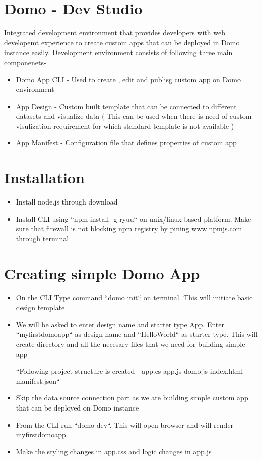 \section{Domo - Dev Studio}

Integrated development environment that provides developers 
with web developemt experience to create custom apps that 
can be deployed in Domo instance easily. Development environment 
consists of following three main componenets-
\begin{itemize}
\item Domo App CLI - Used to create , edit and publisg custom app 
on Domo environment
\item App Design - Custom built template that can be connected to 
different datasets and visualize data ( This can be used when 
there is need of custom visulization requirement for which 
standard template is not available )
\item App Manifest - Configuration file that defines properties 
of custom app
\end{itemize}

\section{Installation}
\begin{itemize}
\item Install node.js through download
\item Install CLI using ``npm install -g ryuu`` on unix/linux based platform. 
   Make sure that firewall is not blocking npm registry by pining
   www.npmjs.com through terminal
\end{itemize}


\section{Creating simple Domo App}
\begin{itemize}
\item On the CLI Type command  ``domo init`` on terminal.
   This will initiate basic design template
\item We will be asked to enter design name and starter type App. 
   Enter ``myfirstdomoapp`` as design name and ``HelloWorld`` as 
   starter type. This will create directory and all the necesary
   files that we need for building simple app

      ``Following project structure is created -
        app.cs
        app.js
        domo.js
        index.html
        manifest.json``~\cite{hid-sp18-523-Dev}

\item Skip the data source connection part as we are building simple
   custom app that can be deployed on Domo instance
\item From the CLI run ``domo dev``. This will open browser and will 
   render myfirstdomoapp.
\item Make the styling changes in app.css and logic changes in app.js

\end{itemize}


